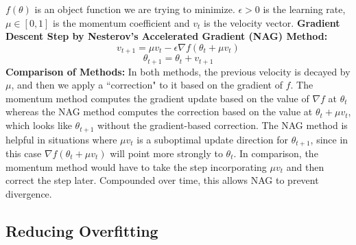 \documentclass[a4paper]{article}
\begin{document}
$f(\theta)$ is an object function we are trying to minimize. $\epsilon > 0$ is the learning rate, $\mu \in [0,1]$ is the momentum coefficient and $v_t$ is the velocity vector.  
\newline
\newline
\textbf{Gradient Descent Step by Nesterov's Accelerated Gradient (NAG) Method:}
$$v_{t+1} = \mu v_t - \epsilon \nabla f(\theta_t + \mu v_t) $$
$$\theta_{t+1} = \theta_t + v_{t+1}$$
\textbf{Comparison of Methods:}
\newline
\newline
In both methods, the previous velocity is decayed by $\mu$, and then we apply a ``correction" to it based on the gradient of $f$. The momentum method computes the gradient update based on the value of $\nabla f$ at $\theta_t$ whereas the NAG method computes the correction based on the value at $\theta_t + \mu v_t$, which looks like $\theta_{t+1}$ without the gradient-based correction. The NAG method is helpful in situations where $\mu v_t$ is a suboptimal update direction for $\theta_{t+1}$, since in this case $\nabla f(\theta_t + \mu v_t) $ will point more strongly to $\theta_t$. In comparison, the momentum method would have to take the step incorporating $\mu v_t$ and then correct the step later. Compounded over time, this allows NAG to prevent divergence.

\subsection{Reducing Overfitting}
\end{document}
